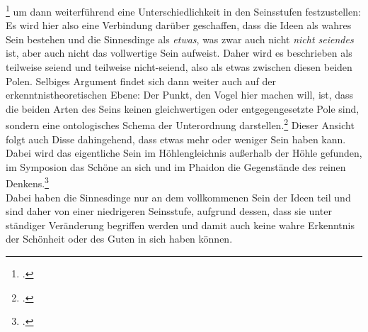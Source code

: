 \footcite[vgl.][S. 162]{Vogel} um dann weiterführend eine Unterschiedlichkeit in den Seinsstufen festzustellen:
Es wird hier also eine Verbindung darüber geschaffen, dass die Ideen als wahres Sein bestehen und die Sinnesdinge als \emph{etwas}, was zwar auch nicht \emph{nicht seiendes} ist, aber auch nicht das vollwertige Sein aufweist. Daher wird es beschrieben als teilweise seiend und teilweise nicht-seiend, also als etwas zwischen diesen beiden Polen. Selbiges Argument findet sich dann weiter auch auf der erkenntnistheoretischen Ebene: 
Der Punkt, den Vogel hier machen will, ist, dass die beiden Arten des Seins keinen gleichwertigen oder entgegengesetzte Pole sind, sondern eine ontologisches Schema der Unterordnung darstellen.\footcite[vgl.][S. 165]{Vogel}
Dieser Ansicht folgt auch Disse dahingehend, dass etwas mehr oder weniger Sein haben kann. Dabei wird das eigentliche Sein im Höhlengleichnis außerhalb der Höhle gefunden, im Symposion das Schöne an sich und im Phaidon die Gegenstände des reinen Denkens.\footcite[vgl.][S. 37]{DisseMetaphysik}\\ Dabei haben die Sinnesdinge nur an dem vollkommenen Sein der Ideen teil und sind daher von einer niedrigeren Seinsstufe, aufgrund dessen, dass sie unter ständiger Veränderung begriffen werden und damit auch keine wahre Erkenntnis der Schönheit oder des Guten in sich haben können.
